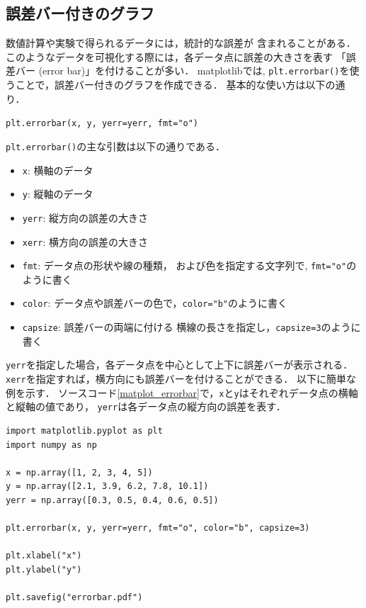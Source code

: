 \documentclass[a4paper,12pt]{jsarticle}
\begin{document}
\subsection{誤差バー付きのグラフ}

数値計算や実験で得られるデータには，統計的な誤差が
含まれることがある．
このようなデータを可視化する際には，各データ点に誤差の大きさを表す
「誤差バー (error bar)」を付けることが多い．
matplotlibでは, \texttt{plt.errorbar()}を使うことで，誤差バー付きのグラフを作成できる．
基本的な使い方は以下の通り．

\begin{center}
\texttt{plt.errorbar(x, y, yerr=yerr, fmt="o")}
\end{center}

\texttt{plt.errorbar()}の主な引数は以下の通りである．

\begin{itemize}
\item \texttt{x}: 横軸のデータ
\item \texttt{y}: 縦軸のデータ
\item \texttt{yerr}: 縦方向の誤差の大きさ
\item \texttt{xerr}: 横方向の誤差の大きさ
\item \texttt{fmt}: データ点の形状や線の種類，
および色を指定する文字列で, \texttt{fmt="o"}のように書く
\item \texttt{color}: データ点や誤差バーの色で，\texttt{color="b"}のように書く
\item \texttt{capsize}: 誤差バーの両端に付ける
横線の長さを指定し，\texttt{capsize=3}のように書く
\end{itemize}

\texttt{yerr}を指定した場合，各データ点を中心として上下に誤差バーが表示される．
\texttt{xerr}を指定すれば，横方向にも誤差バーを付けることができる．
以下に簡単な例を示す．
ソースコード\ref{matplot_errorbar}で，\texttt{x}と\texttt{y}はそれぞれデータ点の横軸と縦軸の値であり，
\texttt{yerr}は各データ点の縦方向の誤差を表す．

\begin{lstlisting}[caption=誤差バー付きのグラフ,
label=matplot_errorbar]
import matplotlib.pyplot as plt
import numpy as np

x = np.array([1, 2, 3, 4, 5])
y = np.array([2.1, 3.9, 6.2, 7.8, 10.1])
yerr = np.array([0.3, 0.5, 0.4, 0.6, 0.5])

plt.errorbar(x, y, yerr=yerr, fmt="o", color="b", capsize=3)

plt.xlabel("x")
plt.ylabel("y")

plt.savefig("errorbar.pdf")
\end{lstlisting}
\end{document}
